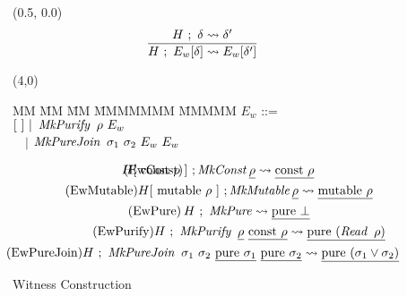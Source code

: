 \begin{figure}[ht!]

\begin{textblock}{3}(0.5, 0.0)
$$
	\frac	{H \ ; \ \delta \leadsto \delta'}
		{H \ ; \ E_w[\delta] \leadsto E_w[\delta']}
$$
\end{textblock}
\begin{textblock}{2}(4,0)
\begin{tabbing}
MM  	\= MM		\= MM \= MMMMMMM \= MMMMM \kill
	\> $E_w$	\> ::=		\> $[\ ] \ | \ \iMkPurify \ \rho \ E_w$ \\
	\>		\> \ \ $|$ 	\> $\iMkPureJoin \ \sigma_1 \ \sigma_2 \ E_w \ E_w$
\end{tabbing}
\end{textblock}

\vspace{3em}
\begin{gather*}
	\tag{EwConst}
	\hspace{-4.9em}
	{ H[\ \rconst \ \rho \ ] \ ; \iMkConst \un{\rho} \lto \un{\rconst \ \rho} }
\\
	\tag{EwMutable}
	{ H[\ \rmutable \ \rho \ ] \  ; \iMkMutable \un{\rho} \lto \un{\rmutable \ \rho} }
\\
	\tag{EwPure}
	\hspace{0.2em}
	{ H \ ; \ \iMkPure \lto \un{\rpure \ \bot} }
\\
	\hspace{3.2em}
	\tag{EwPurify}
	{ 	H \ ; \ \iMkPurify \ \un{\rho} \ \un{\rconst \ \rho} \lto \un{\rpure \ (\iRead \ \rho)}}
\\
	\hspace{-2.6em}
	\tag{EwPureJoin}
	{ 	H \ ; \ \iMkPureJoin \ \sigma_1 \ \sigma_2 \ \un{\rpure \ \sigma_1} \ \un{\rpure \ \sigma_2}
	\lto    \un{\rpure \ (\sigma_1 \lor \sigma_2)} }
\end{gather*}
\vspace{-1em}
\caption{Witness Construction}
\label{fig:witness-construction}
\end{figure}
